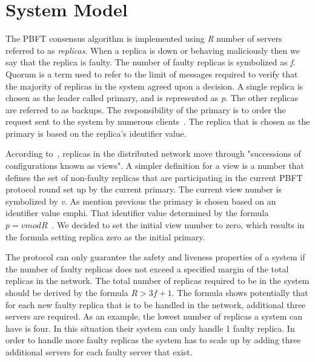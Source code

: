 \section{System Model}
\label{section:systemModel}
The PBFT consensus algorithm is implemented using \emph{R} number of servers referred to as \emph{replicas}. When a replica is down or behaving maliciously then we say that the replica is faulty. The number of faulty replicas is symbolized as \emph{f}. 
Quorum is a term used to refer to the limit of messages required to verify that the majority of replicas in the system agreed upon a decision\cites[p.~408-409]{PAPER:PBFTRecovery}. %
A single replica is chosen as the leader called primary, and is represented as \emph{p}. The other replicas are referred to as backups. The responsibility of the primary is to order the request sent to the system by numerous clients~\cites[p.~456]{BOOK:MVstandver3}[p.~405]{PAPER:PBFTRecovery}. The replica that is chosen as the primary is based on the replica's identifier value.

According to~\cites[p.~3]{PAPER:OGPBFT}[p.~405]{PAPER:PBFTRecovery}, replicas in the distributed network move through "successions of configurations known as views". A simpler definition for a view is a number that defines the set of non-faulty replicas that are participating in the current PBFT protocol round set up by the current primary. The current view number is symbolized by \emph{v}.
As mention previous the primary is chosen based on an identifier value emph{i}. That identifier value determined by the formula $p = v mod R$~\cites[p.~258]{BOOK:BuildDepDistSyst}[p.~3]{PAPER:OGPBFT} {SLIDES:PBFT}. 
We decided to set the initial view number to zero, which results in the formula setting replica zero as the initial primary.

The protocol can only guarantee the safety and liveness properties of a system if the number of faulty replicas does not exceed a specified margin of the total replicas in the network. The total number of replicas required to be in the system should be derived by the formula $R > 3f + 1$.
The formula shows potentially that for each new faulty replica that is to be handled in the network, additional three servers are required. As an example, the lowest number of replicas a system can have is four. In this situation their system can only handle 1 faulty replica. In order to handle more faulty replicas the system has to scale up by adding three additional servers for each faulty server that exist\cites[p.~257]{BOOK:BuildDepDistSyst}[p.~403]{PAPER:PBFTRecovery}{SLIDES:PBFT}[p.~3]{PAPER:OGPBFT}.

